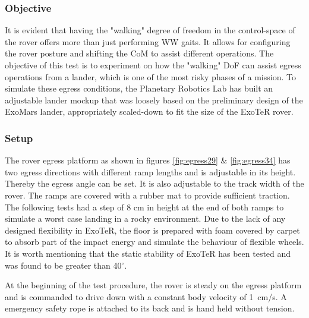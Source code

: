 \documentclass[a4paper,twocolumn]{esapub2005} %
\begin{document}
\subsubsection{Objective}
It is evident that having the "walking" degree of freedom in the control-space
of the rover offers more than just performing WW gaits. It allows for
configuring the rover posture and shifting the CoM to assist different
operations. The objective of this test is to experiment on how the "walking"
DoF can assist egress operations from a lander, which is one of the most risky
phases of a mission. To simulate these egress conditions, the Planetary
Robotics Lab has built an adjustable lander mockup that was loosely based on
the preliminary design of the ExoMars lander, appropriately scaled-down to fit
the size of the ExoTeR rover. 

\subsubsection{Setup}
The rover egress platform as shown in figures \ref{fig:egress29} \&
\ref{fig:egress34} has two egress directions with different ramp lengths and is
adjustable in its height. Thereby the egress angle can be set. It is also
adjustable to the track width of the rover. The ramps are covered with a rubber
mat to provide sufficient traction. The following tests had a step of 8 cm in
height at the end of both ramps to simulate a worst case landing in a rocky
environment.  Due to the lack of any designed flexibility in ExoTeR, the floor
is prepared with foam covered by carpet to absorb part of the impact energy and
simulate the behaviour of flexible wheels. It is worth mentioning that the
static stability of ExoTeR has been tested and was found to be greater than
40$^\circ$.

At the beginning of the test procedure, the rover is steady on the egress
platform and is commanded to drive down with a constant body velocity of
1~\unit{cm/s}. A emergency safety rope is attached to its back and is hand held
without tension. 
\end{document}
